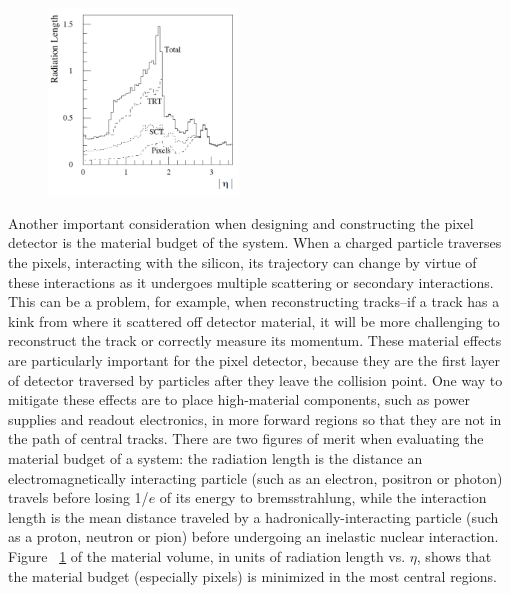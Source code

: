 \begin{figure}
  \begin{center}
	\includegraphics[width=0.45\textwidth]{ATLASDetector/images/id_material_budget.pdf}
	\label{fig:id_material}
	\end{center}
\end{figure}

Another important consideration when designing and constructing the pixel detector is the material budget of the system.  When a charged particle traverses the pixels, interacting with the silicon, its trajectory can change by virtue of these interactions as it undergoes multiple scattering or secondary interactions.  This can be a problem, for example, when reconstructing tracks--if a track has a kink from where it scattered off detector material, it will be more challenging to reconstruct the track or correctly measure its momentum.  These material effects are particularly important for the pixel detector, because they are the first layer of detector traversed by particles after they leave the collision point.  One way to mitigate these effects are to place high-material components, such as power supplies and readout electronics, in more forward regions so that they are not in the path of central tracks.  There are two figures of merit when evaluating the material budget of a system: the radiation length is the distance an electromagnetically interacting particle (such as an electron, positron or photon) travels before losing 1/$e$ of its energy to bremsstrahlung, while the interaction length is the mean distance traveled by a hadronically-interacting particle (such as a proton, neutron or pion) before undergoing an inelastic nuclear interaction.  Figure ~\ref{fig:id_material} of the material volume, in units of radiation length vs. $\eta$, shows that the material budget (especially pixels) is minimized in the most central regions.


